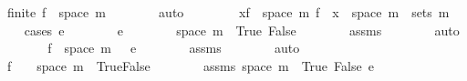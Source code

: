 \begin{isabellebody}
\ {\isachardoublequoteopen}finite\ {\isacharparenleft}{\kern0pt}f\ {\isacharbackquote}{\kern0pt}\ space\ m{\isacharparenright}{\kern0pt}{\isachardoublequoteclose}\isanewline
\ \ \ \ \ \ \isamarkupfalse%
\ auto\isanewline
\ \ \isamarkupfalse%
\isanewline
{}\isamarkupfalse%
\ \isanewline
\ \ \isamarkupfalse%
\ {\isachardoublequoteopen}{\isasymforall}x{\isasymin}f\ {\isacharbackquote}{\kern0pt}\ space\ m{\isachardot}{\kern0pt}\ f\ {\isacharminus}{\kern0pt}{\isacharbackquote}{\kern0pt}\ {\isacharbraceleft}{\kern0pt}x{\isacharbraceright}{\kern0pt}\ {\isasyminter}\ space\ m\ {\isasymin}\ sets\ m{\isachardoublequoteclose}\isanewline
\ \ \isamarkupfalse%
\ {\isacharparenleft}{\kern0pt}cases\ {\isachardoublequoteopen}e\ {\isacharequal}{\kern0pt}\ {}{\isachardoublequoteclose}{\isacharparenright}{\kern0pt}\isanewline
\ \ \ \ \isamarkupfalse%
\ {\isachardoublequoteopen}e\ {\isacharequal}{\kern0pt}\ {}{\isachardoublequoteclose}\isanewline
\ \ \ \ \isamarkupfalse%
\ {\isachardoublequoteopen}space\ m\ {\isacharequal}{\kern0pt}\ {\isacharbraceleft}{\kern0pt}True{\isacharcomma}{\kern0pt}\ False{\isacharbraceright}{\kern0pt}{\isachardoublequoteclose}\isanewline
\ \ \ \ \ \ \isamarkupfalse%
\ assms{\isacharparenleft}{\kern0pt}{}{\isacharparenright}{\kern0pt}\isanewline
\ \ \ \ \ \ \isamarkupfalse%
\ auto\isanewline
\ \ \ \ \isamarkupfalse%
\ \isamarkupfalse%
\ {\isachardoublequoteopen}f\ {\isacharbackquote}{\kern0pt}\ space\ m\ {\isacharequal}{\kern0pt}\ {\isacharbraceleft}{\kern0pt}{}{\isacharcomma}{\kern0pt}\ e{\isacharbraceright}{\kern0pt}{\isachardoublequoteclose}\isanewline
\ \ \ \ \ \ \isamarkupfalse%
\ assms{\isacharparenleft}{\kern0pt}{}{\isacharparenright}{\kern0pt}\isanewline
\ \ \ \ \ \ \isamarkupfalse%
\ auto\isanewline
\ \ \ \ \isamarkupfalse%
\ \isamarkupfalse%
\ {\isachardoublequoteopen}f\ {\isacharminus}{\kern0pt}{\isacharbackquote}{\kern0pt}\ {\isacharbraceleft}{\kern0pt}{}{\isacharbraceright}{\kern0pt}\ {\isasyminter}\ space\ m\ {\isacharequal}{\kern0pt}\ {\isacharbraceleft}{\kern0pt}True{\isacharcomma}{\kern0pt}False{\isacharbraceright}{\kern0pt}{\isachardoublequoteclose}\isanewline
\ \ \ \ \ \ \isamarkupfalse%
\ assms\ {\isacartoucheopen}space\ m\ {\isacharequal}{\kern0pt}\ {\isacharbraceleft}{\kern0pt}True{\isacharcomma}{\kern0pt}\ False{\isacharbraceright}{\kern0pt}{\isacartoucheclose}\ {\isacartoucheopen}e\ {\isacharequal}{\kern0pt}\ {}{\isacartoucheclose}\isanewline

\end{isabellebody}
